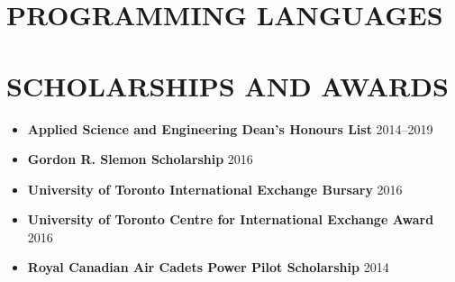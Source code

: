 \documentclass{ResumeTemplate}
\begin{document}
\begin{minipage}[c]{0.30\linewidth}
        \section{PROGRAMMING LANGUAGES}


        \section{SCHOLARSHIPS AND AWARDS}
        \begin{itemize}[noitemsep, leftmargin=*]
            \item \textbf{Applied Science and Engineering Dean's Honours List} \hfill 2014--2019
            \item \textbf{Gordon R. Slemon Scholarship} \hfill 2016
            \item \textbf{University of Toronto International Exchange Bursary} \hfill 2016
            \item \textbf{University of Toronto Centre for International Exchange Award} \hfill 2016
            \item \textbf{Royal Canadian Air Cadets Power Pilot Scholarship} \hfill 2014
        \end{itemize}

    \end{minipage}
    \hspace{0.025\linewidth}
\end{document}
